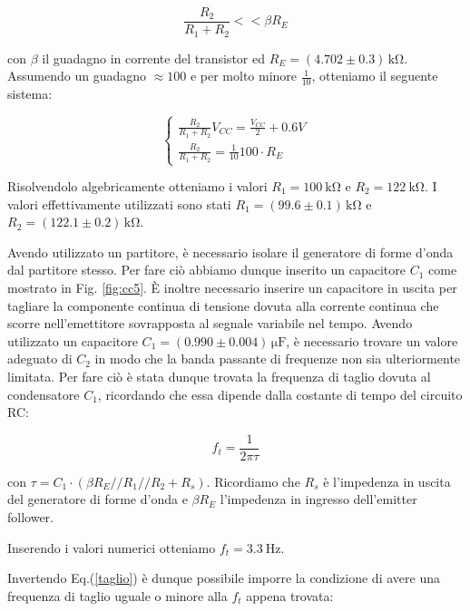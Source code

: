 \begin{equation}
\frac{R_2}{R_1+R_2} <<\beta R_E
\label{partitore2}
\end{equation}

con $\beta$ il guadagno in corrente del transistor ed $R_E=(4.702\pm0.3)\,\si{\kilo\ohm}$. Assumendo un guadagno $\approx 100$ e per molto minore $\frac{1}{10}$, otteniamo il seguente sistema:

\begin{equation}
\begin{cases}
\frac{R_2}{R_1+R_2} V_{CC}=\frac{V_{CC}}{2} + 0.6V\\
\frac{R_2}{R_1+R_2} =\frac{1}{10} 100 \cdot R_E
\end{cases}
\end{equation}

Risolvendolo algebricamente otteniamo i valori $R_1=\SI{100}{\kilo\ohm}$ e $R_2=\SI{122}{\kilo\ohm}$. I valori effettivamente utilizzati sono stati $R_1=(99.6\pm0.1)\,\si{\kilo\ohm}$ e $R_2=(122.1\pm0.2)\,\si{\kilo\ohm}$.

Avendo utilizzato un partitore, è necessario isolare il generatore di forme d'onda dal partitore stesso. Per fare ciò abbiamo dunque inserito un capacitore $C_1$ come mostrato in Fig. \ref{fig:cc5}.
\`E inoltre necessario inserire un capacitore in uscita per tagliare la componente continua di tensione dovuta alla corrente continua che scorre nell'emettitore sovrapposta al segnale variabile nel tempo. 
Avendo utilizzato un capacitore $C_1=(0.990\pm0.004)\,\si{\micro\farad}$, è necessario trovare un valore adeguato di $C_2$ in modo che la banda passante di frequenze non sia ulteriormente limitata. Per fare ciò è stata dunque trovata la frequenza di taglio dovuta al condensatore $C_1$, ricordando che essa dipende dalla costante di tempo del circuito RC:

\begin{equation}
f_t=\frac{1}{2\pi \tau} 
\label{taglio}
\end{equation}

con $\tau=C_1 \cdot (\beta R_E//R_1//R_2+R_s)$. Ricordiamo che $R_s$ è l'impedenza in uscita del generatore di forme d'onda e $\beta R_E$ l'impedenza in ingresso dell'emitter follower.

Inserendo i valori numerici otteniamo $f_t=\SI{3.3}{\hertz}$.

Invertendo Eq.(\ref{taglio}) è dunque possibile imporre la condizione di avere una frequenza di taglio uguale o minore alla $f_t$ appena trovata: 

